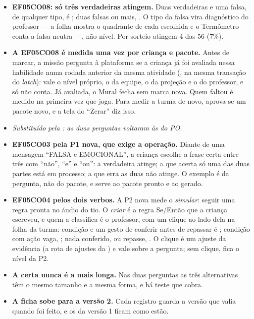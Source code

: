\begin{itemize}
  \item \textbf{EF05CO08: só três verdadeiras atingem.} Duas verdadeiras e uma
    falsa, de qualquer tipo, é ; duas falsas ou mais,
    . O tipo da falsa vira diagnóstico do professor --- a folha
    mostra o quadrante de cada escolhida e o Termômetro conta a falsa neutra
    ---, não nível. Por sorteio atingem 4 das 56 (7\%).
  \item \textbf{A EF05CO08 é medida uma vez por criança e pacote.} Antes de
    marcar, a missão pergunta à plataforma se a criança já foi avaliada nessa
    habilidade numa rodada anterior da mesma atividade
    (, na mesma transação do
    \emph{latch}): vale o nível próprio, o da equipe, o da projeção e o do
    professor, e só  não conta. Já avaliada, o Mural fecha
    sem marca nova. Quem faltou é medido na primeira vez que joga. Para medir a
    turma de novo, aprova-se um pacote novo, e a tela do \enquote{Zerar} diz
    isso.
  \item \emph{Substituído pela : as duas perguntas voltaram às do PO.}
  \item \textbf{EF05CO03 pela P1 nova, que exige a operação.} Diante de uma
    mensagem \enquote{FALSA e EMOCIONAL}, a criança escolhe a frase certa entre
    três com \enquote{não}, \enquote{e} e \enquote{ou}: a verdadeira atinge; a
    que acerta só uma das duas partes está em processo; a que erra as duas não
    atinge. O exemplo é da pergunta, não do pacote, e serve ao pacote pronto e
    ao gerado.
  \item \textbf{EF05CO04 pelos dois verbos.} A P2 nova mede o
    \emph{simular}: seguir uma regra pronta no áudio do tio. O \emph{criar} é a
    regra Se/Então que a criança escreveu, e quem a classifica é o professor,
    com um clique ao lado dela na folha da turma: condição e um gesto de
    conferir antes de repassar é ; condição com ação vaga,
    ; nada conferido, ou repasse, . O clique é
    um ajuste da evidência (a rota de ajustes da ) e vale sobre a
    pergunta; sem clique, fica o nível da P2.
  \item \textbf{A certa nunca é a mais longa.} Nas duas perguntas as três
    alternativas têm o mesmo tamanho e a mesma forma, e há teste que cobra.
  \item \textbf{A ficha sobe para a versão 2.} Cada registro guarda a versão
    que valia quando foi feito, e os da versão 1 ficam como estão.
\end{itemize}

